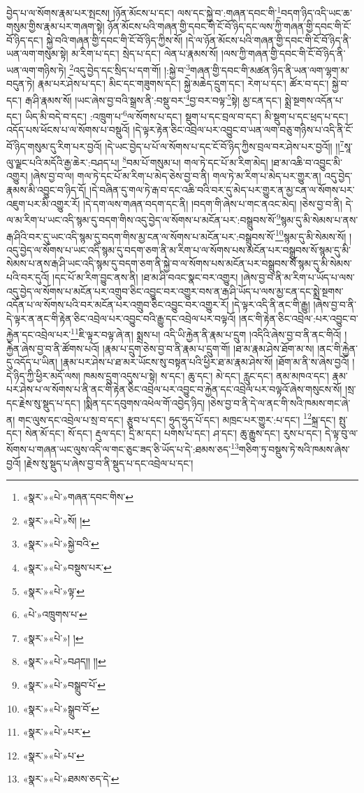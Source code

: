 བྱེད་པ་ལ་སོགས་རྣམ་པར་སྤངས། །ཉོན་མོངས་པ་དང་། ལས་དང་སྐྱེ་བ་:གཞན་དབང་གི་\footnote{«སྣར་»«པེ་»གཞན་དབང་གིས་}བདག་ཉིད་འདི་ཡང་ཆ་གསུམ་གྱིས་རྣམ་པར་གཞག་སྟེ། ཉོན་མོངས་པའི་གཞན་གྱི་དབང་གི་ངོ་བོ་ཉིད་དང་ལས་ཀྱི་གཞན་གྱི་དབང་གི་ངོ་བོ་ཉིད་དང་། སྐྱེ་བའི་གཞན་གྱི་དབང་གི་ངོ་བོ་ཉིད་ཀྱིས་སོ། །དེ་ལ་ཉོན་མོངས་པའི་གཞན་གྱི་དབང་གི་ངོ་བོ་ཉིད་ནི་ཡན་ལག་གསུམ་སྟེ། མ་རིག་པ་དང་། སྲེད་པ་དང་། ལེན་པ་རྣམས་སོ། །ལས་ཀྱི་གཞན་གྱི་དབང་གི་ངོ་བོ་ཉིད་ནི་ཡན་ལག་གཉིས་ཏེ། \footnote{«སྣར་»«པེ་»སོ། ། }འདུ་བྱེད་དང་སྲིད་པ་དག་གོ། །:སྐྱེ་བ་\footnote{«སྣར་»«པེ་»སྐྱེ་བའི་}གཞན་གྱི་དབང་གི་མཚན་ཉིད་ནི་ཡན་ལག་ལྷག་མ་བདུན་ཏེ། རྣམ་པར་ཤེས་པ་དང་། མིང་དང་གཟུགས་དང་། སྐྱེ་མཆེད་དྲུག་དང་། རེག་པ་དང་། ཚོར་བ་དང་། སྐྱེ་བ་དང་། རྒ་ཤི་རྣམས་སོ། །ཡང་ཞེས་བྱ་བའི་སྒྲས་ནི་:བསྡུ་བར་\footnote{«སྣར་»«པེ་»བསྡུས་པར་}བྱ་བར་བལྟ་\footnote{«སྣར་»«པེ་»ལྟ་}སྟེ། མྱ་ངན་དང་། སྨྲེ་སྔགས་འདོན་པ་དང་། ཡིད་མི་བདེ་བ་དང་། :འཁྲུག་པ་\footnote{«པེ་»འཁྲུགས་པ་}ལ་སོགས་པ་དང་། སྡུག་པ་དང་བྲལ་བ་དང་། མི་སྡུག་པ་དང་ཕྲད་པ་དང་། འདོད་པས་ཕོངས་པ་ལ་སོགས་པ་བསྡུའོ། །དེ་ལྟར་རྟེན་ཅིང་འབྲེལ་པར་འབྱུང་བ་ཡན་ལག་བཅུ་གཉིས་པ་འདི་ནི་ངོ་བོ་ཉིད་གསུམ་དུ་རིག་པར་བྱའོ། །དེ་ཡང་བྱེད་པ་པོ་ལ་སོགས་པ་དང་ངོ་བོ་ཉིད་ཀྱིས་བྲལ་བར་ཤེས་པར་བྱའོ།། །།\footnote{«སྣར་»«པེ་»། །}སཱ་ལུ་ལྗང་པའི་མདོའི་རྒྱ་ཆེར་:བཤད་པ། \footnote{«སྣར་»«པེ་»བཤད།། །།}བམ་པོ་གསུམ་པ། གལ་ཏེ་དང་པོ་མ་རིག་མེད། །ཐ་མ་འཆི་བ་འབྱུང་མི་འགྱུར། །ཞེས་བྱ་བ་ལ། གལ་ཏེ་དང་པོ་མ་རིག་པ་མེད་ཅེས་བྱ་བ་ནི། གལ་ཏེ་མ་རིག་པ་མེད་པར་གྱུར་ན། འདུ་བྱེད་རྣམས་མི་འབྱུང་བ་ཉིད་དོ། །དེ་བཞིན་དུ་གལ་ཏེ་རྒ་བ་དང་འཆི་བའི་བར་དུ་མེད་པར་གྱུར་ན་མྱ་ངན་ལ་སོགས་པར་འཇུག་པར་མི་འགྱུར་རོ། །དེ་དག་ལས་གཞན་བདག་དང་ནི། །བདག་གི་ཞེས་པ་གང་ནའང་མེད། །ཅེས་བྱ་བ་ནི། དེ་ལ་མ་རིག་པ་ཡང་འདི་སྙམ་དུ་བདག་གིས་འདུ་བྱེད་ལ་སོགས་པ་མངོན་པར་:བསྒྲུབས་སོ་\footnote{«སྣར་»«པེ་»བསྒྲུབ་པོ་}སྙམ་དུ་མི་སེམས་པ་ནས་རྒ་ཤིའི་བར་དུ་ཡང་འདི་སྙམ་དུ་བདག་གིས་མྱ་ངན་ལ་སོགས་པ་མངོན་པར་:བསྒྲུབས་སོ་\footnote{«སྣར་»«པེ་»སྒྲུབ་བོ་}སྙམ་དུ་མི་སེམས་སོ། །འདུ་བྱེད་ལ་སོགས་པ་ཡང་འདི་སྙམ་དུ་བདག་ཅག་ནི་མ་རིག་པ་ལ་སོགས་པས་མངོན་པར་བསྒྲུབས་སོ་སྙམ་དུ་མི་སེམས་པ་ནས་རྒ་ཤི་ཡང་འདི་སྙམ་དུ་བདག་ཅག་ནི་སྐྱེ་བ་ལ་སོགས་པས་མངོན་པར་བསྒྲུབས་སོ་སྙམ་དུ་མི་སེམས་པའི་བར་དུའོ། །དང་པོ་མ་རིག་བྱུང་ནས་ནི། །ཐ་མ་ཤི་བའང་སྣང་བར་འགྱུར། །ཞེས་བྱ་བ་ནི་མ་རིག་པ་ཡོད་པ་ལས་འདུ་བྱེད་ལ་སོགས་པ་མངོན་པར་འགྲུབ་ཅིང་འབྱུང་བར་འགྱུར་བས་ན་རྒ་ཤི་ཡོད་པ་ལས་མྱ་ངན་དང་སྨྲེ་སྔགས་འདོན་པ་ལ་སོགས་པའི་བར་མངོན་པར་འགྲུབ་ཅིང་འབྱུང་བར་འགྱུར་རོ། །དེ་ལྟར་འདི་ནི་ནང་གི་རྒྱུ། །ཞེས་བྱ་བ་ནི་དེ་ལྟར་ན་ནང་གི་རྟེན་ཅིང་འབྲེལ་པར་འབྱུང་བའི་རྒྱུ་དང་འབྲེལ་པར་བལྟའོ། །ནང་གི་རྟེན་ཅིང་འབྲེལ་:པར་འབྱུང་བ་རྐྱེན་དང་འབྲེལ་པར་\footnote{«སྣར་»«པེ་»པར་}ཇི་ལྟར་བལྟ་ཞེ་ན། སྨྲས་པ། འདི་ཡི་རྐྱེན་ནི་རྣམ་པ་དྲུག །འདིའི་ཞེས་བྱ་བ་ནི་ནང་གིའོ། །རྐྱེན་ཞེས་བྱ་བ་ནི་ཚོགས་པའོ། །རྣམ་པ་དྲུག་ཅེས་བྱ་བ་ནི་རྣམ་པ་དྲུག་གོ། །ཐ་མ་རྣམ་ཤེས་ཐོག་མ་ས། །ནང་གི་རྐྱེན་དུ་འདོད་པ་ཡིན། །རྣམ་པར་ཤེས་པ་ཐ་མར་ཡོངས་སུ་བསྟན་པའི་ཕྱིར་ཐ་མ་རྣམ་ཤེས་སོ། །ཐོག་མ་ནི་ས་ཞེས་བྱའོ། །དེ་ཉིད་ཀྱི་ཕྱིར་མདོ་ལས། ཁམས་དྲུག་འདུས་པ་སྟེ། ས་དང་། ཆུ་དང་། མེ་དང་། རླུང་དང་། ནམ་མཁའ་དང་། རྣམ་པར་ཤེས་པ་ལ་སོགས་པ་ནི་ནང་གི་རྟེན་ཅིང་འབྲེལ་པར་འབྱུང་བ་རྐྱེན་དང་འབྲེལ་པར་བལྟའོ་ཞེས་གསུངས་སོ། །སྲ་དང་རྗེས་སུ་སྡུད་པ་དང་། །སྨིན་དང་དབུགས་འཕེལ་གོ་འབྱེད་ཉིད། །ཅེས་བྱ་བ་ནི་དེ་ལ་ནང་གི་སའི་ཁམས་གང་ཞེ་ན། གང་ལུས་དང་འབྲེལ་པ་སྲ་བ་དང་། རྩུབ་པ་དང་། ཧྲུད་ཧྲུད་པོ་དང་། མཁྲང་པར་གྱུར་:པ་དང་། \footnote{«སྣར་»«པེ་»པ་}སྐྲ་དང་། སྤུ་དང་། སེན་མོ་དང་། སོ་དང་། རྡུལ་དང་། དྲི་མ་དང་། པགས་པ་དང་། ཤ་དང་། ཆུ་རྒྱུས་དང་། རུས་པ་དང་། དེ་ལྟ་བུ་ལ་སོགས་པ་གཞན་ཡང་ལུས་འདི་ལ་གང་ཅུང་ཟད་ཅི་ཡོད་པ་དེ་:ཐམས་ཅད་\footnote{«སྣར་»«པེ་»ཐམས་ཅད་དེ་}གཅིག་ཏུ་བསྡུས་ཏེ་སའི་ཁམས་ཞེས་བྱའོ། །རྗེས་སུ་སྡུད་པ་ཞེས་བྱ་བ་ནི་སྡུད་པ་དང་འབྲེལ་པ་དང་། 